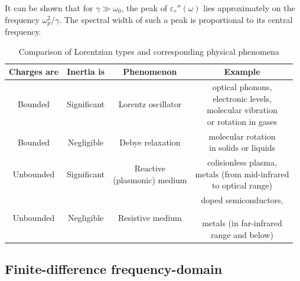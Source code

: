 It can be shown that for $\gamma \gg \omega_0$, the peak of $\varepsilon_r''(\omega)$ lies approximately on the frequency $\omega_p^{2}/\gamma$. The spectral width of such a peak is proportional to its central frequency. 


\begin{table}[ht]   \caption{Comparison of Lorentzian types and corresponding physical phenomena}  \label{tb_lorentzians} \centering 
\begin{tabular}{cc|cc}
 \toprule
\textbf{Charges are}	& \textbf{Inertia is}				& \textbf{Phenomenon}				& \textbf{Example}		 \\
 \hline
Bounded		& Significant				& Lorentz oscillator					& \shortstack{optical phonons, \\electronic levels,\\ molecular vibration \\or rotation in gases}	\\
 \hline
Bounded		& Negligible				& Debye relaxation						& \shortstack{molecular rotation \\in solids or liquids} \\
 \hline
Unbounded	& Significant				& \shortstack{Reactive\\(plasmonic) medium}			& \shortstack{colisionless plasma, \\metals (from mid-infrared\\to optical range)} \\
 \hline
Unbounded	& Negligible				& Resistive medium						& \shortstack{doped semiconductors,\\\newline metals (in far-infrared\\ range and below)} \\
 \bottomrule
 \end{tabular} \end{table}




\subsection{Finite-difference frequency-domain} %

